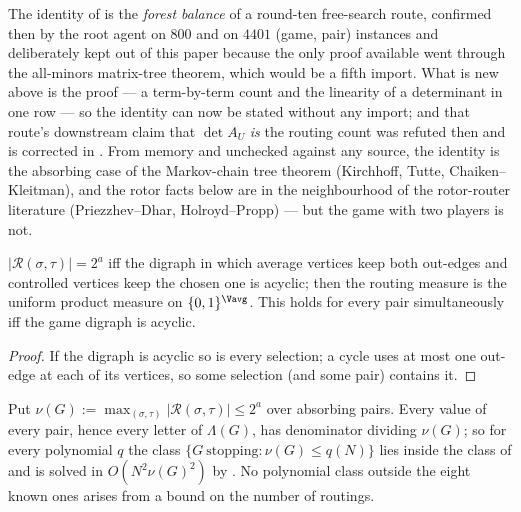 \begin{remark}[Attribution]\label{fresh19:rem-attr}
The identity of  is the \emph{forest balance} of a
round-ten free-search route, confirmed then by the root agent on $800$ and on
$4401$ (game, pair) instances and deliberately kept out of this paper because
the only proof available went through the all-minors matrix-tree theorem, which
would be a fifth import.  What is new above is the proof --- a term-by-term
count and the linearity of a determinant in one row --- so the identity can now
be stated without any import; and that route's downstream claim that $\det A_U$
\emph{is} the routing count was refuted then and is corrected in
.  From memory and unchecked against any source, the
identity is the absorbing case of the Markov-chain tree theorem (Kirchhoff,
Tutte, Chaiken--Kleitman), and the rotor facts below are in the neighbourhood of
the rotor-router literature (Priezzhev--Dhar, Holroyd--Propp) --- but the game
with two players is not.
\end{remark}

\begin{corollary}\label{fresh19:cor-acyclic}
$|\mathcal R(\sigma,\tau)|=2^{a}$ iff the digraph in which average vertices keep
both out-edges and controlled vertices keep the chosen one is acyclic; then the
routing measure is the uniform product measure on $\{0,1\}^{\Vavg}$.  This holds
for every pair simultaneously iff the game digraph is acyclic.
\end{corollary}

\begin{proof}
If the digraph is acyclic so is every selection; a cycle uses at most one
out-edge at each of its vertices, so some selection (and some pair) contains it.
\end{proof}

\begin{proposition}\label{fresh19:prop-collapse}
Put $\nu(G):=\max_{(\sigma,\tau)}|\mathcal R(\sigma,\tau)|\le2^{a}$ over
absorbing pairs.  Every value of every pair, hence every letter of $\Lambda(G)$,
has denominator dividing $\nu(G)$; so for every polynomial $q$ the class
$\{G\ \text{stopping}:\nu(G)\le q(N)\}$ lies inside the class of
 and is solved in $O(N^{2}\nu(G)^{2})$ by
.  No polynomial class outside the eight known ones
arises from a bound on the number of routings.
\end{proposition}


